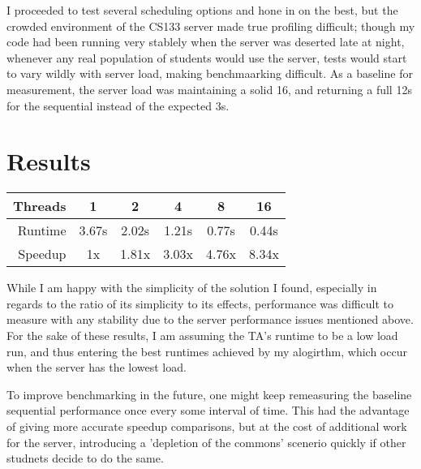 \documentclass[a4paper,10pt]{report}
\begin{document}
I proceeded to test several scheduling options and hone in on the best, but the crowded environment of the CS133 server made true profiling difficult;
though my code had been running very stablely when the server was deserted late at night, whenever any real population of students would use the 
server, tests would start to vary wildly with server load, making benchmaarking difficult.  As a baseline for measurement, the server load was
maintaining a solid 16, and returning a full 12s for the sequential instead of the expected 3s.
 
\section{Results}

 \begin{center}
\begin{tabular}{ r | c  c  c  c  c }
 Threads & 1 & 2 & 4 & 8 & 16 \\ \hline 
 Runtime & 3.67s  & 2.02s  & 1.21s  & 0.77s  & 0.44s  \\
 Speedup & 1x & 1.81x & 3.03x & 4.76x & 8.34x \\
\end{tabular}
 \end{center}

While I am happy with the simplicity of the solution I found, especially in regards to the ratio of its simplicity to its effects, performance was
difficult to measure with any stability due to the server performance issues mentioned above.  For the sake of these results, I am assuming the TA's runtime to be a low load run,
and thus entering the best runtimes achieved by my alogirthm, which occur when the server has the lowest load.  

To improve benchmarking in the future, one might keep remeasuring the baseline sequential performance once every some interval of time.  This had the advantage
of giving more accurate speedup comparisons, but at the cost of additional work for the server, introducing a 'depletion of the commons' scenerio quickly if other studnets
decide to do the same.
\end{document}
